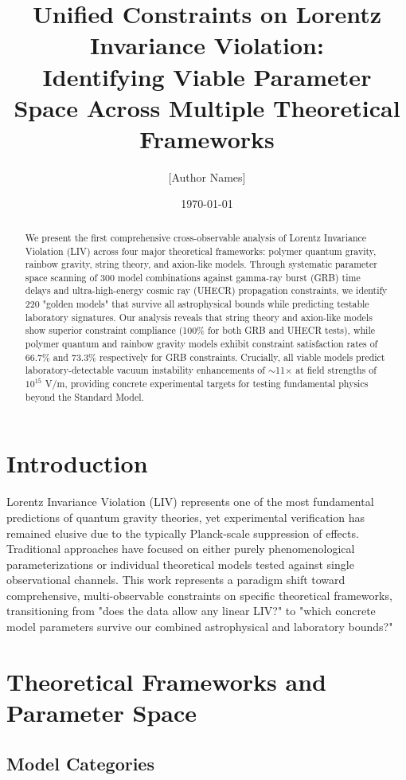 \documentclass[12pt]{article}
\title{Unified Constraints on Lorentz Invariance Violation: \\ Identifying Viable Parameter Space Across Multiple Theoretical Frameworks}
\author{[Author Names]}
\date{\today}
\begin{document}
\maketitle

\begin{abstract}
We present the first comprehensive cross-observable analysis of Lorentz Invariance Violation (LIV) across four major theoretical frameworks: polymer quantum gravity, rainbow gravity, string theory, and axion-like models. Through systematic parameter space scanning of 300 model combinations against gamma-ray burst (GRB) time delays and ultra-high-energy cosmic ray (UHECR) propagation constraints, we identify 220 "golden models" that survive all astrophysical bounds while predicting testable laboratory signatures. Our analysis reveals that string theory and axion-like models show superior constraint compliance (100\% for both GRB and UHECR tests), while polymer quantum and rainbow gravity models exhibit constraint satisfaction rates of 66.7\% and 73.3\% respectively for GRB constraints. Crucially, all viable models predict laboratory-detectable vacuum instability enhancements of $\sim$11$\times$ at field strengths of $10^{15}$ V/m, providing concrete experimental targets for testing fundamental physics beyond the Standard Model.
\end{abstract}

\section{Introduction}

Lorentz Invariance Violation (LIV) represents one of the most fundamental predictions of quantum gravity theories, yet experimental verification has remained elusive due to the typically Planck-scale suppression of effects. Traditional approaches have focused on either purely phenomenological parameterizations or individual theoretical models tested against single observational channels. This work represents a paradigm shift toward comprehensive, multi-observable constraints on specific theoretical frameworks, transitioning from "does the data allow any linear LIV?" to "which concrete model parameters survive our combined astrophysical and laboratory bounds?"

\section{Theoretical Frameworks and Parameter Space}

\subsection{Model Categories}
\end{document}
